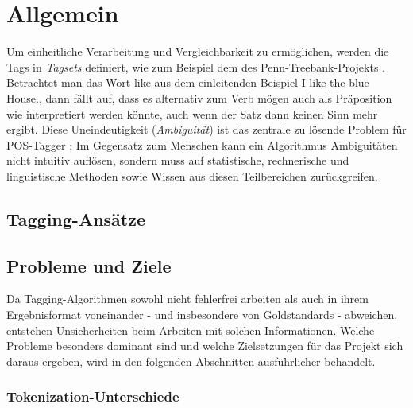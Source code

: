 %
\chapter{Allgemein}
\label{sec:general}

Um einheitliche Verarbeitung und Vergleichbarkeit zu ermöglichen, werden die Tags in \textit{Tagsets} definiert, wie zum Beispiel dem des Penn-Treebank-Projekts \linebreak \cite{Web:PennBank:2003}. \newline
Betrachtet man das Wort \glqq like\grqq{} aus dem einleitenden Beispiel \glqq I like the blue House.\grqq, dann fällt auf, dass es alternativ zum Verb \glqq mögen\grqq{} auch als Präposition \glqq wie\grqq{} interpretiert werden könnte, auch wenn der Satz dann keinen Sinn mehr ergibt. Diese Uneindeutigkeit (\textit{Ambiguität}) ist das zentrale zu lösende Problem für POS-Tagger  \cite{Smith:2011}; Im Gegensatz zum Menschen kann ein Algorithmus Ambiguitäten nicht intuitiv auflösen, sondern muss auf statistische, rechnerische und linguistische Methoden sowie Wissen aus diesen Teilbereichen zurückgreifen. \newline

\section{Tagging-Ansätze}
\label{sec:general:types}

\section{Probleme und Ziele}
\label{sec:general:goals}

Da Tagging-Algorithmen sowohl nicht fehlerfrei arbeiten als auch in ihrem Ergebnisformat voneinander - und insbesondere von Goldstandards - abweichen, entstehen Unsicherheiten beim Arbeiten mit solchen Informationen. Welche Probleme besonders dominant sind und welche Zielsetzungen für das Projekt sich daraus ergeben, wird in den folgenden Abschnitten ausführlicher behandelt.

\subsection{Tokenization-Unterschiede}
\label{sec:general:goals:tok}


